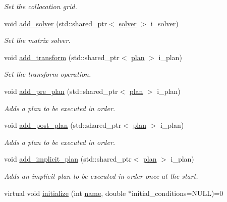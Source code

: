 \begin{DoxyCompactItemize}
\begin{DoxyCompactList}\small\item\em Set the collocation grid. \end{DoxyCompactList}\item 
void \hyperlink{classbases_1_1element_a798c23f47fb27d78569619cff8a03cf8}{add\-\_\-solver} (std\-::shared\-\_\-ptr$<$ \hyperlink{classbases_1_1solver}{solver} $>$ i\-\_\-solver)
\begin{DoxyCompactList}\small\item\em Set the matrix solver. \end{DoxyCompactList}\item 
void \hyperlink{classbases_1_1element_a9e46cf2492d82e9574ebcdbd39be3391}{add\-\_\-transform} (std\-::shared\-\_\-ptr$<$ \hyperlink{classbases_1_1plan}{plan} $>$ i\-\_\-plan)
\begin{DoxyCompactList}\small\item\em Set the transform operation. \end{DoxyCompactList}\item 
void \hyperlink{classbases_1_1element_aa3ee0ec9bda610aead7a6c8a02b84e19}{add\-\_\-pre\-\_\-plan} (std\-::shared\-\_\-ptr$<$ \hyperlink{classbases_1_1plan}{plan} $>$ i\-\_\-plan)
\begin{DoxyCompactList}\small\item\em Adds a plan to be executed in order. \end{DoxyCompactList}\item 
void \hyperlink{classbases_1_1element_aac0b4f2a8cf1aa6f6831ba99fe9d32df}{add\-\_\-post\-\_\-plan} (std\-::shared\-\_\-ptr$<$ \hyperlink{classbases_1_1plan}{plan} $>$ i\-\_\-plan)
\begin{DoxyCompactList}\small\item\em Adds a plan to be executed in order. \end{DoxyCompactList}\item 
void \hyperlink{classbases_1_1element_ad1ebcca153d00d0279df6c395ad91e83}{add\-\_\-implicit\-\_\-plan} (std\-::shared\-\_\-ptr$<$ \hyperlink{classbases_1_1plan}{plan} $>$ i\-\_\-plan)
\begin{DoxyCompactList}\small\item\em Adds an implicit plan to be executed in order once at the start. \end{DoxyCompactList}\item 
virtual void \hyperlink{classbases_1_1element_a8c0350a45f7aff09ba8ebbfb2a789027}{initialize} (int \hyperlink{classbases_1_1element_a52af85c34174ec732a3feb6a7e63fbc6}{name}, double $\ast$initial\-\_\-conditions=N\-U\-L\-L)=0

\end{DoxyCompactItemize}
